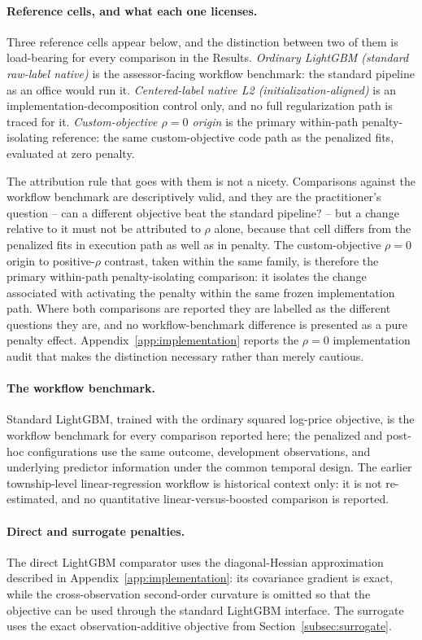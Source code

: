\documentclass[10pt]{article}
\theoremstyle{definition}
\newcommand{\1}{\mathbf{1}}
\begin{document}
\paragraph{Reference cells, and what each one licenses.}
Three reference cells appear below, and the distinction between two of them is
load-bearing for every comparison in the Results. \emph{Ordinary LightGBM (standard
raw-label native)} is the assessor-facing workflow benchmark: the standard pipeline as an
office would run it. \emph{Centered-label native L2 (initialization-aligned)} is an
implementation-decomposition control only, and no full regularization path is traced for
it. \emph{Custom-objective $\rho=0$ origin} is the primary within-path penalty-isolating
reference: the same custom-objective code path as the penalized fits, evaluated at zero
penalty.

The attribution rule that goes with them is not a nicety. Comparisons against
the workflow benchmark are descriptively valid, and they are the practitioner's question
-- can a different objective beat the standard pipeline? -- but a change relative to it
must not be attributed to $\rho$ alone, because that cell differs from the penalized fits
in execution path as well as in penalty. The custom-objective $\rho=0$ origin to
positive-$\rho$ contrast, taken within the same family, is therefore the primary
within-path penalty-isolating comparison: it isolates the change associated with
activating the penalty within the same frozen implementation path. Where both comparisons
are reported they are labelled as the different questions they are, and no
workflow-benchmark difference is presented as a pure penalty effect.
Appendix~\ref{app:implementation} reports the $\rho=0$ implementation audit that makes
the distinction necessary rather than merely cautious.

\paragraph{The workflow benchmark.}
Standard LightGBM, trained with the ordinary squared log-price objective, is the workflow benchmark for every comparison reported here; the penalized and post-hoc configurations use the same outcome, development observations, and underlying predictor information under the common temporal design. The earlier township-level linear-regression workflow is historical context only: it is not re-estimated, and no quantitative linear-versus-boosted comparison is reported.

\paragraph{Direct and surrogate penalties.}
The direct LightGBM comparator uses the diagonal-Hessian approximation described in Appendix~\ref{app:implementation}: its covariance gradient is exact, while the cross-observation second-order curvature is omitted so that the objective can be used through the standard LightGBM interface. The surrogate uses the exact observation-additive objective from Section~\ref{subsec:surrogate}.
\end{document}
